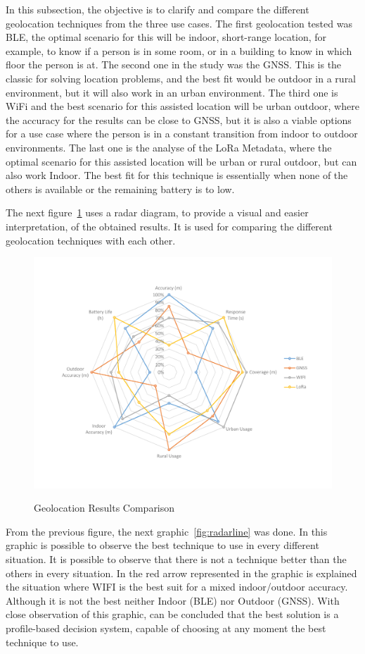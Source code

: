 In this subsection, the objective is to clarify and compare the different geolocation techniques from the three use cases. The first geolocation tested was BLE, the optimal scenario for this will be indoor, short-range location, for example, to know if a person is in some room, or in a building to know in which floor the person is at. The second one in the study was the GNSS. This is the classic for solving location problems, and the best fit would be outdoor in a rural environment, but it will also work in an urban environment. The third one is WiFi and the best scenario for this assisted location will be urban outdoor, where the accuracy for the results can be close to GNSS, but it is also a viable options for a use case where the person is in a constant transition from indoor to outdoor environments. The last one is the analyse of the LoRa Metadata, where the optimal scenario for this assisted location will be urban or rural outdoor, but can also work Indoor. The best fit for this technique is essentially when none of the others is available or the remaining battery is to low.

The next figure~\ref{fig:radar1} uses a radar diagram, to provide a visual and easier interpretation, of the obtained results. It is used for  comparing the different geolocation techniques with each other.
\begin{figure}[htbp]
  \centering
  
    {\includegraphics[width=0.8\linewidth]{Chapters/Figures/radarfinal3.pdf}}%
 
  \caption{Geolocation Results Comparison}
  \label{fig:radar1}
\end{figure}

From the previous figure, the next graphic~\ref{fig:radarline} was done. In this graphic is possible to observe the best technique to use in every different situation. It is possible to observe that there is not a technique better than the others in every situation. In the red arrow represented in the graphic is explained the situation where WIFI is the best suit for a mixed indoor/outdoor accuracy. Although it is not the best neither Indoor (BLE) nor Outdoor (GNSS). With   close observation of this graphic, can be concluded that the best solution is a profile-based decision system, capable of choosing at any moment the best technique to use.

